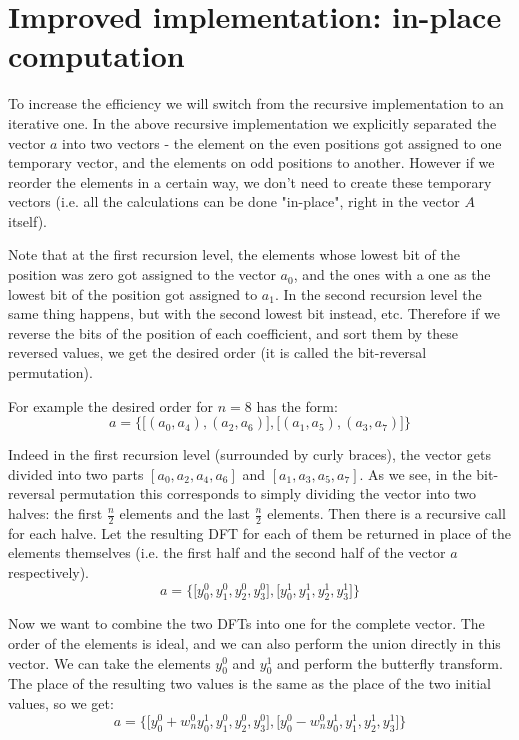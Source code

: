\documentclass{article}
\begin{document}
\section{Improved implementation: in-place computation}

To increase the efficiency we will switch from the recursive implementation to an iterative one. In the above recursive implementation we explicitly separated the vector $a$ into two vectors - the element on the even positions got assigned to one temporary vector, and the elements on odd positions to another. However if we reorder the elements in a certain way, we don't need to create these temporary vectors (i.e. all the calculations can be done "in-place", right in the vector $A$ itself).

Note that at the first recursion level, the elements whose lowest bit of the position was zero got assigned to the vector $a_0$, and the ones with a one as the lowest bit of the position got assigned to $a_1$. In the second recursion level the same thing happens, but with the second lowest bit instead, etc. Therefore if we reverse the bits of the position of each coefficient, and sort them by these reversed values, we get the desired order (it is called the bit-reversal permutation).

For example the desired order for $n = 8$ has the form:
$$a = \bigg\{ \Big[ (a_0, a_4), (a_2, a_6) \Big], \Big[ (a_1, a_5), (a_3, a_7) \Big] \bigg\}$$

Indeed in the first recursion level (surrounded by curly braces), the vector gets divided into two parts $[a_0, a_2, a_4, a_6]$ and $[a_1, a_3, a_5, a_7]$. As we see, in the bit-reversal permutation this corresponds to simply dividing the vector into two halves: the first $\frac{n}{2}$ elements and the last $\frac{n}{2}$ elements. Then there is a recursive call for each halve. Let the resulting DFT for each of them be returned in place of the elements themselves (i.e. the first half and the second half of the vector $a$ respectively).
$$a = \bigg\{ \Big[y_0^0, y_1^0, y_2^0, y_3^0\Big], \Big[y_0^1, y_1^1, y_2^1, y_3^1 \Big] \bigg\}$$

Now we want to combine the two DFTs into one for the complete vector. The order of the elements is ideal, and we can also perform the union directly in this vector. We can take the elements $y_0^0$ and $y_0^1$ and perform the butterfly transform. The place of the resulting two values is the same as the place of the two initial values, so we get:
$$a = \bigg\{ \Big[y_0^0 + w_n^0 y_0^1, y_1^0, y_2^0, y_3^0\Big], \Big[y_0^0 - w_n^0 y_0^1, y_1^1, y_2^1, y_3^1\Big] \bigg\}$$
\end{document}
